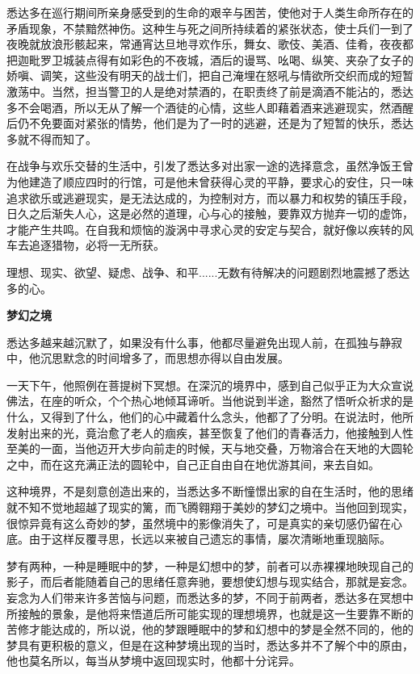 \documentclass[twoside,openany]{book}
\newcommand{\mt}[1]{\textbullet \textbf{#1}}
\begin{document}
悉达多在巡行期间所亲身感受到的生命的艰辛与困苦，使他对于人类生命所存在的矛盾现象，不禁黯然神伤。这种生与死之间所持续着的紧张状态，使士兵们一到了夜晚就放浪形骸起来，常通宵达旦地寻欢作乐，舞女、歌伎、美酒、佳肴，夜夜都把迦毗罗卫城装点得有如彩色的不夜城，酒后的谩骂、吆喝、纵笑、夹杂了女子的娇嗔、调笑，这些没有明天的战士们，把自己淹埋在怒吼与情欲所交织而成的短暂激荡中。当然，担当警卫的人是绝对禁酒的，在职责终了前是滴酒不能沾的，悉达多不会喝酒，所以无从了解一个酒徒的心情，这些人即藉着酒来逃避现实，然酒醒后仍不免要面对紧张的情势，他们是为了一时的逃避，还是为了短暂的快乐，悉达多就不得而知了。

在战争与欢乐交替的生活中，引发了悉达多对出家一途的选择意念，虽然净饭王曾为他建造了顺应四时的行馆，可是他未曾获得心灵的平静，要求心的安住，只一味追求欲乐或逃避现实，是无法达成的，为控制对方，而以暴力和权势的镇压手段，日久之后渐失人心，这是必然的道理，心与心的接触，要靠双方抛弃一切的虚饰，才能产生共鸣。在自我和烦恼的漩涡中寻求心灵的安定与契合，就好像以疾转的风车去追逐猎物，必将一无所获。

理想、现实、欲望、疑虑、战争、和平......无数有待解决的问题剧烈地震撼了悉达多的心。

\mt{梦幻之境}

悉达多越来越沉默了，如果没有什么事，他都尽量避免出现人前，在孤独与静寂中，他沉思默念的时间增多了，而思想亦得以自由发展。

一天下午，他照例在菩提树下冥想。在深沉的境界中，感到自己似乎正为大众宣说佛法，在座的听众，个个热心地倾耳谛听。当他说到半途，豁然了悟听众祈求的是什么，又得到了什么，他们的心中藏着什么念头，他都了了分明。在说法时，他所发射出来的光，竟治愈了老人的痼疾，甚至恢复了他们的青春活力，他接触到人性至美的一面，当他迈开大步向前走的时候，天与地交叠，万物溶合在天地的大圆轮之中，而在这充满正法的圆轮中，自己正自由自在地优游其间，来去自如。

这种境界，不是刻意创造出来的，当悉达多不断憧憬出家的自在生活时，他的思绪就不知不觉地超越了现实的篱，而飞腾翱翔于美妙的梦幻之境中。当他回到现实，很惊异竟有这么奇妙的梦，虽然境中的影像消失了，可是真实的亲切感仍留在心底。由于这样反覆寻思，长远以来被自己遗忘的事情，屡次清晰地重现脑际。

梦有两种，一种是睡眠中的梦，一种是幻想中的梦，前者可以赤裸裸地映现自己的影子，而后者能随着自己的思绪任意奔驰，要想使幻想与现实结合，那就是妄念。妄念为人们带来许多苦恼与问题，而悉达多的梦，不同于前两者，悉达多在冥想中所接触的景象，是他将来悟道后所可能实现的理想境界，也就是这一生要靠不断的苦修才能达成的，所以说，他的梦跟睡眠中的梦和幻想中的梦是全然不同的，他的梦具有更积极的意义，但是在这种梦境出现的当时，悉达多并不了解个中的原由，他也莫名所以，每当从梦境中返回现实时，他都十分诧异。
\end{document}
